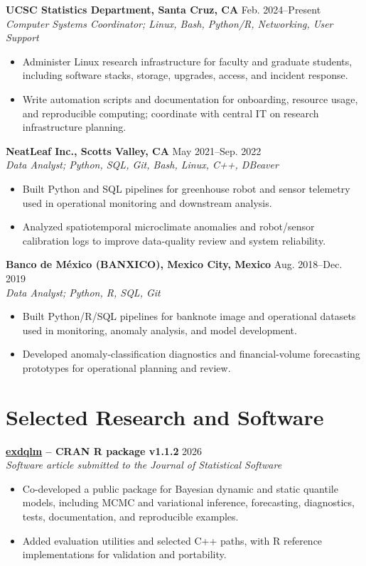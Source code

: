 \documentclass[10pt,letterpaper]{article}
\newcommand{\cvsection}[1]{%
  \Needspace{4\baselineskip}%
  \section*{#1}%
}
\newcommand{\entry}[3]{%
  \Needspace{5\baselineskip}%
  \textbf{#1} \hfill #2\\
  \textit{#3}\\[-2pt]
}
\newcommand{\projectentry}[3]{%
  \Needspace{5\baselineskip}%
  \textbf{#1} \hfill #2\\
  \textit{#3}\\[-2pt]
}
\newcommand{\tightspace}{\vspace{1pt}}
\begin{document}
\entry{UCSC Statistics Department, Santa Cruz, CA}{Feb. 2024--Present}{Computer Systems Coordinator; Linux, Bash, Python/R, Networking, User Support}
\begin{itemize}
  \item Administer Linux research infrastructure for faculty and graduate students, including software stacks, storage, upgrades, access, and incident response.
  \item Write automation scripts and documentation for onboarding, resource usage, and reproducible computing; coordinate with central IT on research infrastructure planning.
\end{itemize}
\tightspace

\entry{NeatLeaf Inc., Scotts Valley, CA}{May 2021--Sep. 2022}{Data Analyst; Python, SQL, Git, Bash, Linux, C++, DBeaver}
\begin{itemize}
  \item Built Python and SQL pipelines for greenhouse robot and sensor telemetry used in operational monitoring and downstream analysis.
  \item Analyzed spatiotemporal microclimate anomalies and robot/sensor calibration logs to improve data-quality review and system reliability.
\end{itemize}
\tightspace

\entry{Banco de M\'exico (BANXICO), Mexico City, Mexico}{Aug. 2018--Dec. 2019}{Data Analyst; Python, R, SQL, Git}
\begin{itemize}
  \item Built Python/R/SQL pipelines for banknote image and operational datasets used in monitoring, anomaly analysis, and model development.
  \item Developed anomaly-classification diagnostics and financial-volume forecasting prototypes for operational planning and review.
\end{itemize}

\cvsection{Selected Research and Software}
\projectentry{\href{https://CRAN.R-project.org/package=exdqlm}{exdqlm} -- CRAN R package v1.1.2}{2026}{Software article submitted to the \textit{Journal of Statistical Software}}
\begin{itemize}
  \item Co-developed a public package for Bayesian dynamic and static quantile models, including MCMC and variational inference, forecasting, diagnostics, tests, documentation, and reproducible examples.
  \item Added evaluation utilities and selected C++ paths, with R reference implementations for validation and portability.
\end{itemize}
\tightspace
\end{document}
